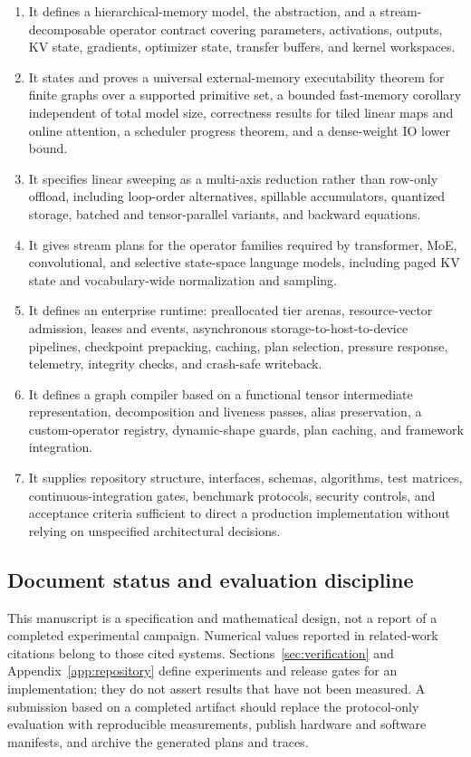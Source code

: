 \begin{enumerate}
  \item It defines a hierarchical-memory model, the \VT{} abstraction, and a stream-decomposable operator contract covering parameters, activations, outputs, KV state, gradients, optimizer state, transfer buffers, and kernel workspaces.
  \item It states and proves a universal external-memory executability theorem for finite graphs over a supported primitive set, a bounded fast-memory corollary independent of total model size, correctness results for tiled linear maps and online attention, a scheduler progress theorem, and a dense-weight IO lower bound.
  \item It specifies \AMS linear sweeping as a multi-axis reduction rather than row-only offload, including loop-order alternatives, spillable accumulators, quantized storage, batched and tensor-parallel variants, and backward equations.
  \item It gives stream plans for the operator families required by transformer, MoE, convolutional, and selective state-space language models, including paged KV state and vocabulary-wide normalization and sampling.
  \item It defines an enterprise runtime: preallocated tier arenas, resource-vector admission, leases and events, asynchronous storage-to-host-to-device pipelines, checkpoint prepacking, caching, plan selection, pressure response, telemetry, integrity checks, and crash-safe writeback.
  \item It defines a graph compiler based on a functional tensor intermediate representation, decomposition and liveness passes, alias preservation, a custom-operator registry, dynamic-shape guards, plan caching, and framework integration.
  \item It supplies repository structure, interfaces, schemas, algorithms, test matrices, continuous-integration gates, benchmark protocols, security controls, and acceptance criteria sufficient to direct a production implementation without relying on unspecified architectural decisions.
\end{enumerate}

\subsection{Document status and evaluation discipline}

This manuscript is a specification and mathematical design, not a report of a completed experimental campaign. Numerical values reported in related-work citations belong to those cited systems. Sections~\ref{sec:verification} and Appendix~\ref{app:repository} define experiments and release gates for an \AMS implementation; they do not assert results that have not been measured. A submission based on a completed artifact should replace the protocol-only evaluation with reproducible measurements, publish hardware and software manifests, and archive the generated plans and traces.

